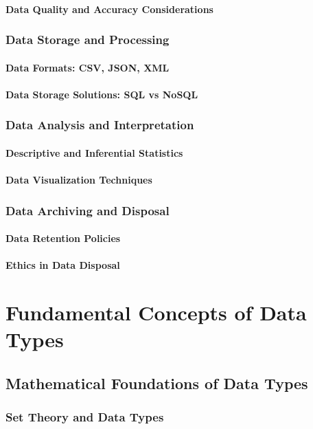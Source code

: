 \documentclass[12pt, oneside]{book}
\begin{document}
\subsubsection{Data Quality and Accuracy Considerations}
\subsection{Data Storage and Processing}
\subsubsection{Data Formats: CSV, JSON, XML}
\subsubsection{Data Storage Solutions: SQL vs NoSQL}
\subsection{Data Analysis and Interpretation}
\subsubsection{Descriptive and Inferential Statistics}
\subsubsection{Data Visualization Techniques}
\subsection{Data Archiving and Disposal}
\subsubsection{Data Retention Policies}
\subsubsection{Ethics in Data Disposal}

\chapter{Fundamental Concepts of Data Types}
\section{Mathematical Foundations of Data Types}
\subsection{Set Theory and Data Types}
\end{document}
